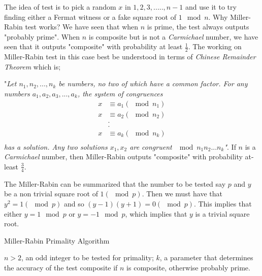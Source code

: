 \documentclass[conference]{IEEEtran}
\begin{document}
The idea of test is to pick a random $x$ in ${1,2,3,.....,n-1}$ and use it to try finding either a Fermat witness\cite{fermat} or a fake square root of $1 \mod n$. Why Miller-Rabin test works? We have seen that when $n$ is prime, the test always outputs "probably prime". When $n$ is composite but is not a \emph{Carmichael} number, we have seen that it outputs "composite" with probability at least $\frac{1}{2}$. The working on Miller-Rabin test in this case best be understood in terms of \emph{Chinese Remainder Theorem}\cite{chinese_theorem} which is;


"\emph{Let $n_1, n_2,...,n_k$ be numbers, no two of which have a common factor. For any numbers $a_1, a_2, a_3,...,a_k$, the system of congruences }
\begin{align*}
x &\equiv a_1 (\mod n_1) \\
x &\equiv a_2 (\mod n_2) \\
&.\\
&.\\
x &\equiv a_k (\mod n_k) \\
\end{align*}
\emph{has a solution. Any two solutions $x_1, x_2$ are congruent $\mod n_1 n_2 ... n_k$"}. If $n$ is a \emph{Carmichael} number, then Miller-Rabin outputs "composite" with probability at-least $\frac{3}{4}$. %


The Miller-Rabin can be summarized that the number to be tested say $p$ and $y$ be a non trivial square root of $1 (\mod p)$.\cite{miller-rabin} Then we must have that $y^{2} = 1 (\mod p)$ and so $(y-1)(y+1) = 0(\mod p)$. This implies that either $y = 1 \mod p$ or $y = -1 \mod p$, which implies that $y$ is a trivial square root.


\begin{algorithm}                      %
\caption{Miller-Rabin Primality Algorithm}          %
\label{alg1}                           %
\begin{algorithmic}                    %
    \REQUIRE $n>2$, an odd integer to be tested for primality; $k$, a parameter that determines the accuracy of the test
    \ENSURE composite if $n$ is composite, otherwise probably prime.
    
   
   \REPEAT
	\ENDIF
		\ENDIF
		\ENDIF
	\ENDFOR
\end{algorithmic}
\end{algorithm}
\end{document}
